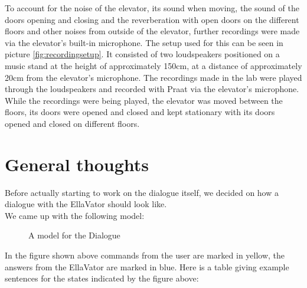 \documentclass[a4paper, 12pt]{article}
\begin{document}
To account for the noise of the elevator, its sound when moving, the sound of the doors opening and closing and the reverberation with open doors on the different floors and other noises from outside of the elevator, further recordings were made via the elevator's built-in microphone. The setup used for this can be seen in picture \ref{fig:recordingsetup}.
It consisted of two loudspeakers positioned on a music stand at the height of approximately 150cm, at a distance of approximately 20cm from the elevator's microphone. 
The recordings made in the lab were played through the loudspeakers and recorded with Praat via the elevator's microphone. 
While the recordings were being played, the elevator was moved between the floors, its doors were opened and closed and kept stationary with its doors opened and closed on different floors.

\newpage
\section{General thoughts}
Before actually starting to work on the dialogue itself, we decided on how a dialogue with the EllaVator should look like. \\

We came up with the following model: \\


\begin{figure} [ht]
  \caption{A model for the Dialogue}
  \label{fig: Dialogue flow}
\end{figure}

In the figure shown above commands from the user are marked in yellow, the answers from the EllaVator are marked in blue.
Here is a table giving example sentences for the states indicated by the figure above: \\
\end{document}
